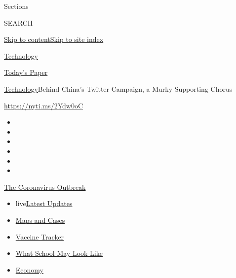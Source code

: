 Sections

SEARCH

\protect\hyperlink{site-content}{Skip to
content}\protect\hyperlink{site-index}{Skip to site index}

\href{https://www.nytimes.com/section/technology}{Technology}

\href{https://myaccount.nytimes.com/auth/login?response_type=cookie\&client_id=vi}{}

\href{https://www.nytimes.com/section/todayspaper}{Today's Paper}

\href{/section/technology}{Technology}\textbar{}Behind China's Twitter
Campaign, a Murky Supporting Chorus

\url{https://nyti.ms/2Ydw0oC}

\begin{itemize}
\item
\item
\item
\item
\item
\item
\end{itemize}

\href{https://www.nytimes.com/news-event/coronavirus?action=click\&pgtype=Article\&state=default\&region=TOP_BANNER\&context=storylines_menu}{The
Coronavirus Outbreak}

\begin{itemize}
\tightlist
\item
  live\href{https://www.nytimes.com/2020/08/01/world/coronavirus-covid-19.html?action=click\&pgtype=Article\&state=default\&region=TOP_BANNER\&context=storylines_menu}{Latest
  Updates}
\item
  \href{https://www.nytimes.com/interactive/2020/us/coronavirus-us-cases.html?action=click\&pgtype=Article\&state=default\&region=TOP_BANNER\&context=storylines_menu}{Maps
  and Cases}
\item
  \href{https://www.nytimes.com/interactive/2020/science/coronavirus-vaccine-tracker.html?action=click\&pgtype=Article\&state=default\&region=TOP_BANNER\&context=storylines_menu}{Vaccine
  Tracker}
\item
  \href{https://www.nytimes.com/interactive/2020/07/29/us/schools-reopening-coronavirus.html?action=click\&pgtype=Article\&state=default\&region=TOP_BANNER\&context=storylines_menu}{What
  School May Look Like}
\item
  \href{https://www.nytimes.com/live/2020/07/31/business/stock-market-today-coronavirus?action=click\&pgtype=Article\&state=default\&region=TOP_BANNER\&context=storylines_menu}{Economy}
\end{itemize}

